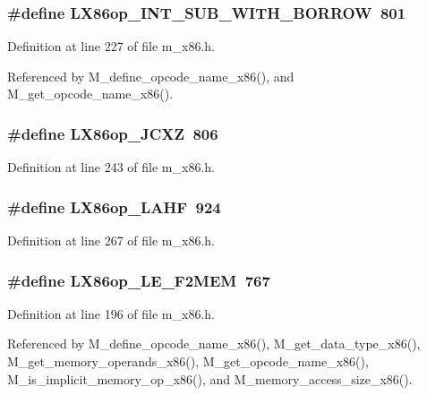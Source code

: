 \subsubsection{\setlength{\rightskip}{0pt plus 5cm}\#define LX86op\_\-INT\_\-SUB\_\-WITH\_\-BORROW~801}\label{m__x86_8h_27e62c0e76e1a1522a036f6ab078de85}




Definition at line 227 of file m\_\-x86.h.

Referenced by M\_\-define\_\-opcode\_\-name\_\-x86(), and M\_\-get\_\-opcode\_\-name\_\-x86().
\subsubsection{\setlength{\rightskip}{0pt plus 5cm}\#define LX86op\_\-JCXZ~806}\label{m__x86_8h_891efaea420ba86163e5c98537ae9ea0}




Definition at line 243 of file m\_\-x86.h.
\subsubsection{\setlength{\rightskip}{0pt plus 5cm}\#define LX86op\_\-LAHF~924}\label{m__x86_8h_f0c4205bd309002ac1a825e79b81ec25}




Definition at line 267 of file m\_\-x86.h.
\subsubsection{\setlength{\rightskip}{0pt plus 5cm}\#define LX86op\_\-LE\_\-F2MEM~767}\label{m__x86_8h_f0861a0597d03593bf12adf543378aa0}




Definition at line 196 of file m\_\-x86.h.

Referenced by M\_\-define\_\-opcode\_\-name\_\-x86(), M\_\-get\_\-data\_\-type\_\-x86(), M\_\-get\_\-memory\_\-operands\_\-x86(), M\_\-get\_\-opcode\_\-name\_\-x86(), M\_\-is\_\-implicit\_\-memory\_\-op\_\-x86(), and M\_\-memory\_\-access\_\-size\_\-x86().
